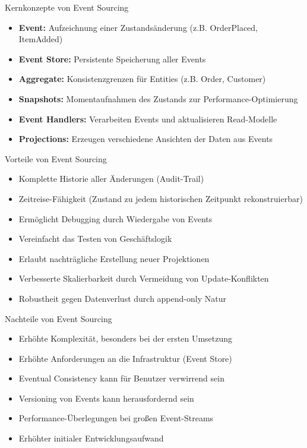\begin{concept}{Kernkonzepte von Event Sourcing}\\
    \begin{itemize}
        \item \textbf{Event:} Aufzeichnung einer Zustandsänderung (z.B. OrderPlaced, ItemAdded)
        \item \textbf{Event Store:} Persistente Speicherung aller Events
        \item \textbf{Aggregate:} Konsistenzgrenzen für Entities (z.B. Order, Customer)
        \item \textbf{Snapshots:} Momentaufnahmen des Zustands zur Performance-Optimierung
        \item \textbf{Event Handlers:} Verarbeiten Events und aktualisieren Read-Modelle
        \item \textbf{Projections:} Erzeugen verschiedene Ansichten der Daten aus Events
    \end{itemize}
\end{concept}

\begin{concept}{Vorteile von Event Sourcing}\\
    \begin{itemize}
        \item Komplette Historie aller Änderungen (Audit-Trail)
        \item Zeitreise-Fähigkeit (Zustand zu jedem historischen Zeitpunkt rekonstruierbar)
        \item Ermöglicht Debugging durch Wiedergabe von Events
        \item Vereinfacht das Testen von Geschäftslogik
        \item Erlaubt nachträgliche Erstellung neuer Projektionen
        \item Verbesserte Skalierbarkeit durch Vermeidung von Update-Konflikten
        \item Robustheit gegen Datenverlust durch append-only Natur
    \end{itemize}
\end{concept}

\begin{concept}{Nachteile von Event Sourcing}\\
    \begin{itemize}
        \item Erhöhte Komplexität, besonders bei der ersten Umsetzung
        \item Erhöhte Anforderungen an die Infrastruktur (Event Store)
        \item Eventual Consistency kann für Benutzer verwirrend sein
        \item Versioning von Events kann herausfordernd sein
        \item Performance-Überlegungen bei großen Event-Streams
        \item Erhöhter initialer Entwicklungsaufwand
    \end{itemize}
\end{concept}

